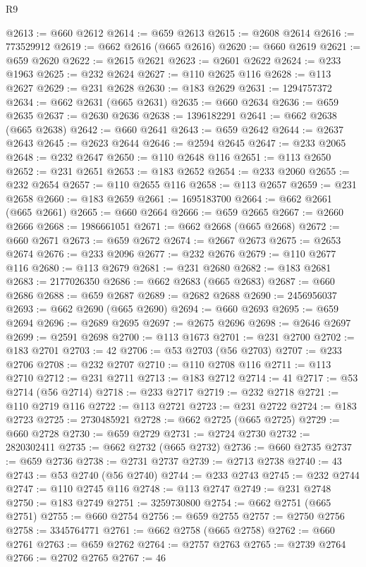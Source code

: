 \begin{lexlean}{R9}
\begin{coremodule}
@2613 := @660 @2612
@2614 := @659 @2613
@2615 := @2608 @2614
@2616 := 773529912
@2619 := @662 @2616 (@665 @2616)
@2620 := @660 @2619
@2621 := @659 @2620
@2622 := @2615 @2621
@2623 := @2601 @2622
@2624 := @233 @1963
@2625 := @232 @2624
@2627 := @110 @2625 @116
@2628 := @113 @2627
@2629 := @231 @2628
@2630 := @183 @2629
@2631 := 1294757372
@2634 := @662 @2631 (@665 @2631)
@2635 := @660 @2634
@2636 := @659 @2635
@2637 := @2630 @2636
@2638 := 1396182291
@2641 := @662 @2638 (@665 @2638)
@2642 := @660 @2641
@2643 := @659 @2642
@2644 := @2637 @2643
@2645 := @2623 @2644
@2646 := @2594 @2645
@2647 := @233 @2065
@2648 := @232 @2647
@2650 := @110 @2648 @116
@2651 := @113 @2650
@2652 := @231 @2651
@2653 := @183 @2652
@2654 := @233 @2060
@2655 := @232 @2654
@2657 := @110 @2655 @116
@2658 := @113 @2657
@2659 := @231 @2658
@2660 := @183 @2659
@2661 := 1695183700
@2664 := @662 @2661 (@665 @2661)
@2665 := @660 @2664
@2666 := @659 @2665
@2667 := @2660 @2666
@2668 := 1986661051
@2671 := @662 @2668 (@665 @2668)
@2672 := @660 @2671
@2673 := @659 @2672
@2674 := @2667 @2673
@2675 := @2653 @2674
@2676 := @233 @2096
@2677 := @232 @2676
@2679 := @110 @2677 @116
@2680 := @113 @2679
@2681 := @231 @2680
@2682 := @183 @2681
@2683 := 2177026350
@2686 := @662 @2683 (@665 @2683)
@2687 := @660 @2686
@2688 := @659 @2687
@2689 := @2682 @2688
@2690 := 2456956037
@2693 := @662 @2690 (@665 @2690)
@2694 := @660 @2693
@2695 := @659 @2694
@2696 := @2689 @2695
@2697 := @2675 @2696
@2698 := @2646 @2697
@2699 := @2591 @2698
@2700 := @113 @1673
@2701 := @231 @2700
@2702 := @183 @2701
@2703 := 42
@2706 := @53 @2703 (@56 @2703)
@2707 := @233 @2706
@2708 := @232 @2707
@2710 := @110 @2708 @116
@2711 := @113 @2710
@2712 := @231 @2711
@2713 := @183 @2712
@2714 := 41
@2717 := @53 @2714 (@56 @2714)
@2718 := @233 @2717
@2719 := @232 @2718
@2721 := @110 @2719 @116
@2722 := @113 @2721
@2723 := @231 @2722
@2724 := @183 @2723
@2725 := 2730485921
@2728 := @662 @2725 (@665 @2725)
@2729 := @660 @2728
@2730 := @659 @2729
@2731 := @2724 @2730
@2732 := 2820302411
@2735 := @662 @2732 (@665 @2732)
@2736 := @660 @2735
@2737 := @659 @2736
@2738 := @2731 @2737
@2739 := @2713 @2738
@2740 := 43
@2743 := @53 @2740 (@56 @2740)
@2744 := @233 @2743
@2745 := @232 @2744
@2747 := @110 @2745 @116
@2748 := @113 @2747
@2749 := @231 @2748
@2750 := @183 @2749
@2751 := 3259730800
@2754 := @662 @2751 (@665 @2751)
@2755 := @660 @2754
@2756 := @659 @2755
@2757 := @2750 @2756
@2758 := 3345764771
@2761 := @662 @2758 (@665 @2758)
@2762 := @660 @2761
@2763 := @659 @2762
@2764 := @2757 @2763
@2765 := @2739 @2764
@2766 := @2702 @2765
@2767 := 46

\end{coremodule}
\end{lexlean}
